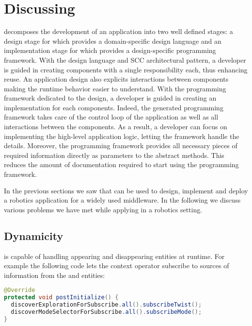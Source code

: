 
\section{Discussing}
\label{sec:discussing}

\diaspec{} decomposes the development of an application into two well
defined stages: a design stage for which \diaspec{} provides a
domain-specific design language and an implementation stage for which
\diaspec{} provides a design-specific programming framework. With the
design language and SCC architectural pattern, a developer is guided
in creating components with a single responsibility each, thus
enhancing reuse. An application design also explicits interactions
between components making the runtime behavior easier to understand.
With the programming framework dedicated to the design, a developer is
guided in creating an implementation for each components.
Indeed, the generated programming framework takes care of the control
loop of the application as well as all interactions between the
components. As a result, a developer can focus on implementing the
high-level application logic, letting the framework handle the
details. Moreover, the programming framework provides all necessary
pieces of required information directly as parameters to the abstract
methods. This reduces the amount of documentation required to start
using the programming framework.

In the previous sections we saw that \diaspec{} can be used to design,
implement and deploy a robotics application for a widely used
middleware. In the following we discuss various problems we have met
while applying \diaspec{} in a robotics setting.

\subsection{\diaspec{} Dynamicity}

\diaspec{} is capable of handling appearing and disappearing entities
at runtime. For example the following code lets the 
context operator subscribe to sources of information from the
 and  entities:

\begin{lstlisting}[language=java,numbers=none]
@Override
protected void postInitialize() {
  discoverExplorationForSubscribe.all().subscribeTwist();
  discoverModeSelectorForSubscribe.all().subscribeMode();
}
\end{lstlisting}

